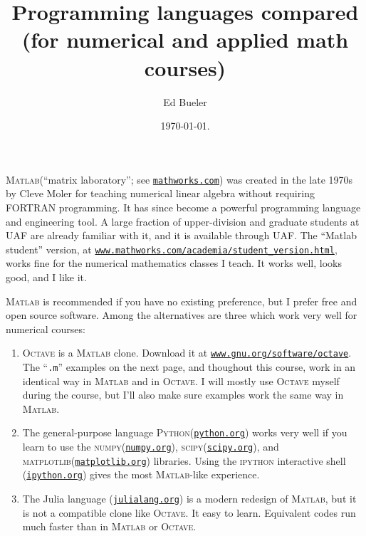 \documentclass[11pt]{amsart}
\newcommand{\Matlab}{\textsc{Matlab}\xspace}
\newcommand{\Octave}{\textsc{Octave}\xspace}
\newcommand{\Python}{\textsc{Python}\xspace}
\newcommand{\numpy}{\textsc{numpy}\xspace}
\newcommand{\scipy}{\textsc{scipy}\xspace}
\newcommand{\matplotlib}{\textsc{matplotlib}\xspace}
\begin{document}
\title{Programming languages compared \\ (for numerical and applied math courses)}

\author{Ed Bueler}

\date{\today.}

\maketitle
\normalsize
\thispagestyle{empty}

\newcommand{\hrf}[2]{\href{#1}{\texttt{#2}}}

\Matlab (``matrix laboratory''; see \hrf{http://www.mathworks.com/}{mathworks.com}) was created in the late 1970s by Cleve Moler for teaching numerical linear algebra without requiring FORTRAN programming.  It has since become a powerful programming language and engineering tool.  A large fraction of upper-division and graduate students at UAF are already familiar with it, and it is available through UAF.  The ``Matlab student'' version, at \hrf{https://www.mathworks.com/academia/student_version.html}{\texttt{www.mathworks.com/academia/student\_version.html}}, works fine for the numerical mathematics classes I teach.  It works well, looks good, and I like it.

\Matlab is recommended if you have no existing preference, but I prefer free and open source software.  Among the alternatives are three which work very well for numerical courses:
\renewcommand{\labelenumi}{\arabic{enumi}.}
\begin{enumerate}
\item \Octave is a \Matlab clone.  Download it at
\hrf{http://www.gnu.org/software/octave/}{www.gnu.org/software/octave}.  The ``\texttt{.m}'' examples on the next page, and thoughout this course, work in an identical way in \Matlab and in \Octave.  I will mostly use \Octave myself during the course, but I'll also make sure examples work the same way in \Matlab.
\item The general-purpose language \Python (\hrf{http://python.org/}{python.org}) works very well if you learn to use the \numpy (\hrf{https://numpy.org/}{numpy.org}), \scipy (\hrf{http://www.scipy.org/}{scipy.org}), and \matplotlib (\hrf{http://matplotlib.org/}{matplotlib.org}) libraries.  Using the \textsc{ipython} interactive shell (\hrf{http://ipython.org/}{ipython.org}) gives the most \Matlab-like experience.
\item The Julia language (\hrf{https://julialang.org/}{julialang.org}) is a modern redesign of \Matlab, but it is not a compatible clone like \Octave.  It easy to learn.  Equivalent codes run much faster than in \Matlab or \Octave.
\end{enumerate}
\end{document}
